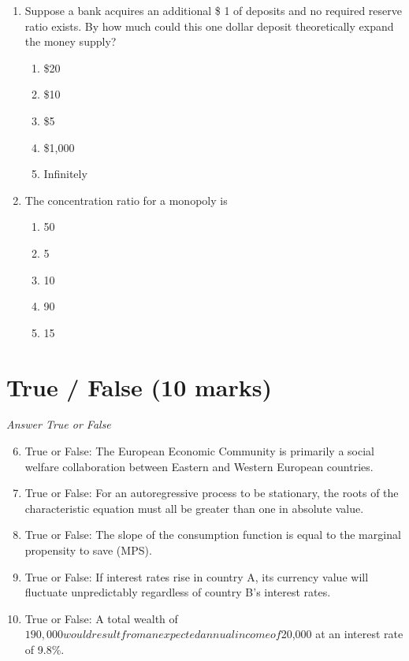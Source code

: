 \documentclass[12pt]{article}
\begin{document}
\begin{enumerate}[label=\arabic*.]
\begin{enumerate}[label=(\alph*)]
\end{enumerate}
\item Suppose a bank acquires an additional \$ 1 of deposits and no required reserve ratio
exists. By how much could this one dollar deposit theoretically expand the money supply?
\begin{enumerate}[label=(\alph*)]
    \item \$20
    \item \$10
    \item \$5
    \item \$1,000
    \item Infinitely
\end{enumerate}
\item The concentration ratio for a monopoly is
\begin{enumerate}[label=(\alph*)]
    \item 50
    \item 5
    \item 10
    \item 90
    \item 15
\end{enumerate}
\end{enumerate}

\section*{True / False (10 marks)}
\textit{Answer True or False}
\begin{enumerate}[label=\arabic*.]
\setcounter{enumi}{5}
\item True or False: The European Economic Community is primarily a social welfare collaboration between Eastern and Western European countries.
\item True or False: For an autoregressive process to be stationary, the roots of the characteristic equation must all be greater than one in absolute value.
\item True or False: The slope of the consumption function is equal to the marginal propensity to save (MPS).
\item True or False: If interest rates rise in country A, its currency value will fluctuate unpredictably regardless of country B's interest rates.
\item True or False: A total wealth of $190,000 would result from an expected annual income of $20,000 at an interest rate of 9.8\%.
\end{enumerate}
\end{document}
